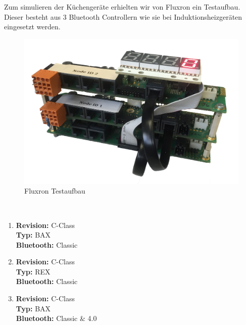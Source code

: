 Zum simulieren der Küchengeräte erhielten wir von Fluxron ein Testaufbau. Dieser besteht aus 3 Bluetooth Controllern wie sie bei Induktionsheizgeräten eingesetzt werden.

\begin{figure}
	\includegraphics[scale=0.1025]{appendix/res/fluxron_device_transparent}
	\caption{Fluxron Testaufbau}
\end{figure}

\ 

\begin{enumerate}
\item \textbf{Revision:} C-Class\\ \textbf{Typ:} BAX\\ \textbf{Bluetooth:} Classic
\item \textbf{Revision:} C-Class\\ \textbf{Typ:} REX\\ \textbf{Bluetooth:} Classic
\item \textbf{Revision:} C-Class\\ \textbf{Typ:} BAX\\ \textbf{Bluetooth:} Classic \& 4.0
\end{enumerate}
